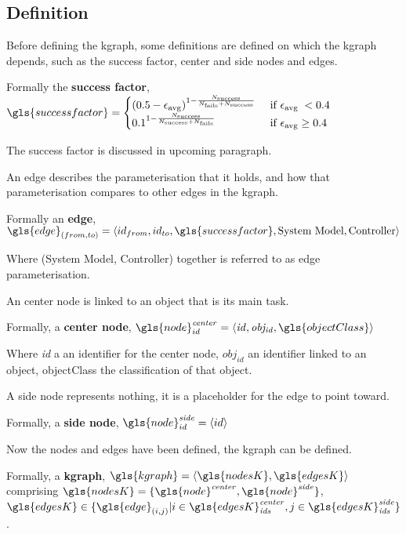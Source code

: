 \subsection{Definition}%
\label{subsec:kgraph_definition}
Before defining the \ac{kgraph}, some definitions are defined on which the \ac{kgraph} depends, such as the success factor, center and side nodes and edges.\bs

Formally the \textbf{success factor}, $\gls{successfactor} = \begin{cases} \left(0.5-\epsilon_{\textrm {avg}}\right)^{1-\frac{N_\textrm{success}}{N_\textrm{fails}+ N_\textrm{success}}} & \textrm { if } \epsilon_{\textrm {avg }}<0.4 \\ 0.1^{1-\frac{N_\textrm{success}}{N_\textrm{success}+N_\textrm{fails}}} & \textrm{ if } \epsilon_{\textrm{avg}} \geq 0.4 \end{cases}$\bs

\noindent The success factor is discussed in upcoming paragraph.\bs

\noindent An edge describes the parameterisation that it holds, and how that parameterisation compares to other edges in the \ac{kgraph}.\bs

Formally an \textbf{edge}, $\gls{edge}_{(from, to)} = \left\langle id_{from}, id_{to}, \gls{successfactor}, \textrm{System Model}, \textrm{Controller}\right\rangle$\bs

\noindent Where (System Model, Controller) together is referred to as edge parameterisation.\bs

\noindent An center node is linked to an object that is its main task.\bs

Formally, a \textbf{center node}, $\gls{node}^{\mathit{center}}_{id} =\left\langle \mathit{id}, \mathit{obj_{id}}, \gls{objectClass} \right\rangle $\bs

Where \textit{id} a an identifier for the center node, $\mathit{obj_{id}}$ an identifier linked to an object, \gls{objectClass} the classification of that object.\bs

\noindent A side node represents nothing, it is a placeholder for the edge to point toward.\bs

Formally, a \textbf{side node}, $\gls{node}^{\mathit{side}}_{id} =\left\langle id \right\rangle $\bs

\noindent Now the nodes and edges have been defined, the \ac{kgraph} can be defined.\bs

Formally, a \textbf{\acl{kgraph}}, $\gls{kgraph} = \left\langle \gls{nodesK}, \gls{edgesK} \right\rangle $
\\comprising $\gls{nodesK} = \{\gls{node}^{\mathit{center}}, \gls{node}^{\mathit{side}}\}$, \quad $\gls{edgesK} \in \{\gls{edge}_{(i,j)}| i \in \gls{edgesK}^\mathit{center}_\mathit{ids}, j \in \gls{edgesK}^\mathit{side}_\mathit{ids} \}$.\bs

